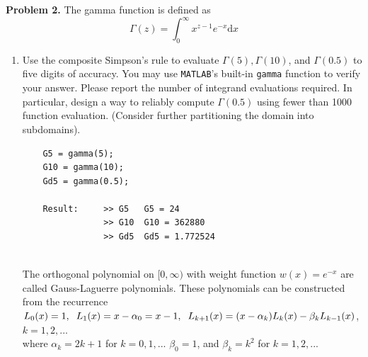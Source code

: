 \documentclass[14pt,a4paper]{article}
\begin{document}
\label{Problem 2}
\large\textbf{Problem 2.} The gamma function is defined as
$$\Gamma(z) = \int_{0}^{\infty}x^{z-1}e^{-x}\mathrm{d}x$$
 
\begin{enumerate}
	\label{2a} 
	\item Use the composite Simpson's rule to evaluate $\Gamma(5), \Gamma(10)$, and $\Gamma(0.5)$ to five digits of accuracy. You may use \texttt{MATLAB}'s built-in \texttt{gamma} function to verify your answer. Please report the number of integrand evaluations required. In particular, design a way to reliably compute $\Gamma(0.5)$ using fewer than 1000 function evaluation. (Consider further partitioning the domain into subdomains).
	\begin{lstlisting}
	G5 = gamma(5);
	G10 = gamma(10);
	Gd5 = gamma(0.5);
	
	Result: 	>> G5	G5 = 24
				>> G10	G10 = 362880
				>> Gd5	Gd5 = 1.772524
	
	\end{lstlisting}
	
	
	The orthogonal polynomial on $[0, \infty)$ with weight function $w(x) = e^{-x}$ are called Gauss-Laguerre polynomials. These polynomials can be constructed from the recurrence\\
	$L_0(x) = 1, \hspace{0.2cm} L_1(x) = x-\alpha_0 = x-1, \hspace{0.2cm} L_{k+1}(x) = (x-\alpha_k)L_k(x)-\beta_kL_{k-1}(x)$, \hspace{0.2cm} $k = 1,2, ...$\\
	where $\alpha_k = 2k+1$ for $k = 0,1, ...$ \hspace{0.2cm} $\beta_0 = 1$, and $\beta_k = k^2$ for $k = 1,2, ...$\\
		

\end{enumerate}
\end{document}

